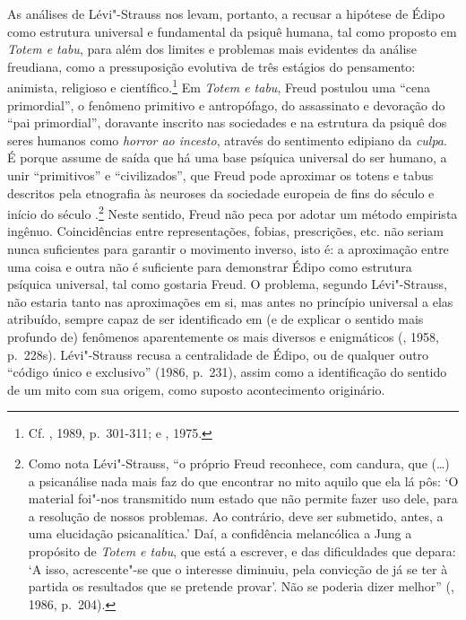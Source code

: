 As análises de Lévi"-Strauss nos levam, portanto, a recusar a hipótese de
Édipo como estrutura universal e fundamental da psiquê humana, tal como
proposto em \emph{Totem e tabu}, para além dos limites e problemas mais
evidentes da análise freudiana, como a pressuposição evolutiva de três
estágios do pensamento: animista, religioso e científico.\footnote{Cf.
  , 1989, p.~301-311; e , 1975.} Em \emph{Totem e tabu}, Freud
postulou uma ``cena primordial'', o fenômeno primitivo e antropófago, do
assassinato e devoração do ``pai primordial'', doravante inscrito nas
sociedades e na estrutura da psiquê dos seres humanos como \emph{horror
ao incesto}, através do sentimento edipiano da \emph{culpa}. É porque
assume de saída que há uma base psíquica universal do ser humano, a unir
``primitivos'' e ``civilizados'', que Freud pode aproximar os totens e
tabus descritos pela etnografia às neuroses da sociedade europeia de
fins do século  e início do século .\footnote{Como nota
  Lévi"-Strauss, ``o próprio Freud reconhece, com candura, que (\ldots{}) a
  psicanálise nada mais faz do que encontrar no mito aquilo que ela lá
  pôs: `O material foi"-nos transmitido num estado que não permite fazer
  uso dele, para a resolução de nossos problemas. Ao contrário, deve ser
  submetido, antes, a uma elucidação psicanalítica.' Daí, a confidência
  melancólica a Jung a propósito de \emph{Totem e tabu}, que está a
  escrever, e das dificuldades que depara: `A isso, acrescente"-se que o
  interesse diminuiu, pela convicção de já se ter à partida os
  resultados que se pretende provar'. Não se poderia dizer melhor''
  (, 1986, p.~204).} Neste sentido, Freud não peca por adotar
um método empirista ingênuo. Coincidências entre representações, fobias,
prescrições, etc. não seriam nunca suficientes para garantir o movimento
inverso, isto é: a aproximação entre uma coisa e outra não é suficiente
para demonstrar Édipo como estrutura psíquica universal, tal como
gostaria Freud. O problema, segundo Lévi"-Strauss, não estaria tanto nas
aproximações em si, mas antes no princípio universal a elas atribuído,
sempre capaz de ser identificado em (e de explicar o sentido mais
profundo de) fenômenos aparentemente os mais diversos e
enigmáticos (, 1958, p.~228s). Lévi"-Strauss recusa a
centralidade de Édipo, ou de qualquer outro ``código único e
exclusivo'' (1986, p.~231), assim como a
identificação do sentido de um mito com sua origem, como suposto
acontecimento originário.

